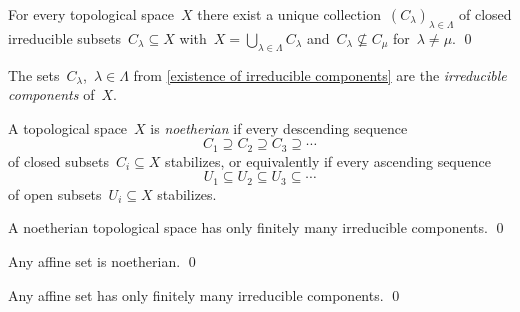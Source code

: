 \begin{proposition}
  \label{existence of irreducible components}
  For every topological space~$X$ there exist a unique collection~$( C_\lambda )_{\lambda \in \Lambda}$ of closed irreducible subsets~$C_\lambda \subseteq X$ with~$X = \bigcup_{\lambda \in \Lambda} C_\lambda$ and~$C_\lambda \nsubseteq C_\mu$ for~$\lambda \neq \mu$.
  \qed
\end{proposition}


\begin{definition}
  The sets~$C_\lambda$,~$\lambda \in \Lambda$ from \cref{existence of irreducible components} are the \emph{irreducible components} of~$X$.
\end{definition}


\begin{definition}
  A topological space~$X$ is \emph{noetherian} if every descending sequence
  \[
              C_1
    \supseteq C_2
    \supseteq C_3
    \supseteq \dotsb
  \]
  of closed subsets~$C_i \subseteq X$ stabilizes, or equivalently if every ascending sequence
  \[
              U_1
    \subseteq U_2
    \subseteq U_3
    \subseteq \dotsb
  \]
  of open subsets~$U_i \subseteq X$ stabilizes.
\end{definition}


\begin{lemma}
  A noetherian topological space has only finitely many irreducible components.
  \qed
\end{lemma}


\begin{lemma}
  Any affine set is noetherian.
  \qed
\end{lemma}


\begin{corollary}
  Any affine set has only finitely many irreducible components.
  \qed
\end{corollary}


